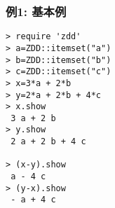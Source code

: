 \subsubsection*{例1: 基本例}



\begin{Verbatim}[baselinestretch=0.7,frame=single]
> require 'zdd'
> a=ZDD::itemset("a")
> b=ZDD::itemset("b")
> c=ZDD::itemset("c")
> x=3*a + 2*b
> y=2*a + 2*b + 4*c
> x.show
 3 a + 2 b
> y.show
 2 a + 2 b + 4 c

> (x-y).show
 a - 4 c
> (y-x).show
 - a + 4 c
\end{Verbatim}
